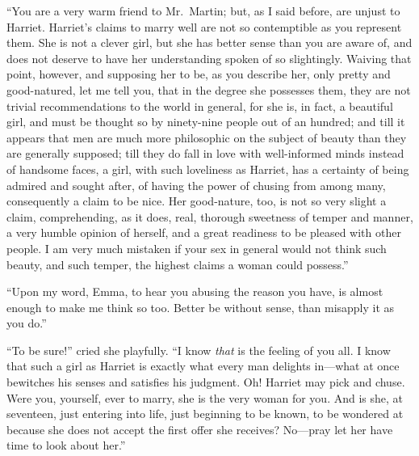 ``You are a very warm friend to Mr.\ Martin; but, as I said before,
are unjust to Harriet.  Harriet's claims to marry well are not
so contemptible as you represent them.  She is not a clever girl,
but she has better sense than you are aware of, and does not
deserve to have her understanding spoken of so slightingly.
Waiving that point, however, and supposing her to be, as you
describe her, only pretty and good-natured, let me tell you, that in
the degree she possesses them, they are not trivial recommendations
to the world in general, for she is, in fact, a beautiful girl,
and must be thought so by ninety-nine people out of an hundred;
and till it appears that men are much more philosophic on the subject
of beauty than they are generally supposed; till they do fall
in love with well-informed minds instead of handsome faces, a girl,
with such loveliness as Harriet, has a certainty of being admired
and sought after, of having the power of chusing from among many,
consequently a claim to be nice.  Her good-nature, too, is not so very
slight a claim, comprehending, as it does, real, thorough sweetness
of temper and manner, a very humble opinion of herself, and a great
readiness to be pleased with other people.  I am very much mistaken
if your sex in general would not think such beauty, and such temper,
the highest claims a woman could possess.''

``Upon my word, Emma, to hear you abusing the reason you have,
is almost enough to make me think so too.  Better be without sense,
than misapply it as you do.''

``To be sure!'' cried she playfully.  ``I know \emph{that} is the feeling
of you all.  I know that such a girl as Harriet is exactly
what every man delights in---what at once bewitches his senses
and satisfies his judgment.  Oh! Harriet may pick and chuse.
Were you, yourself, ever to marry, she is the very woman for you.
And is she, at seventeen, just entering into life, just beginning
to be known, to be wondered at because she does not accept the first
offer she receives? No---pray let her have time to look about her.''

